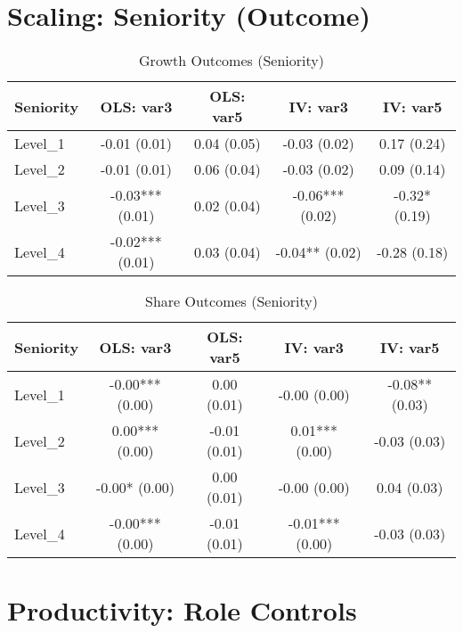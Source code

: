 \documentclass[11pt]{article}
\begin{document}
\section{Scaling: Seniority (Outcome)}

\begin{table}[H]
\centering
\caption{Growth Outcomes (Seniority)}
\begin{tabular}{lcccc}
\toprule
Seniority & OLS: var3 & OLS: var5 & IV: var3 & IV: var5 \\
\midrule
Level\_1 & -0.01 (0.01) & 0.04 (0.05) & -0.03 (0.02) & 0.17 (0.24) \\
Level\_2 & -0.01 (0.01) & 0.06 (0.04) & -0.03 (0.02) & 0.09 (0.14) \\
Level\_3 & -0.03*** (0.01) & 0.02 (0.04) & -0.06*** (0.02) & -0.32* (0.19) \\
Level\_4 & -0.02*** (0.01) & 0.03 (0.04) & -0.04** (0.02) & -0.28 (0.18) \\
\bottomrule
\end{tabular}
\end{table}

\begin{table}[H]
\centering
\caption{Share Outcomes (Seniority)}
\begin{tabular}{lcccc}
\toprule
Seniority & OLS: var3 & OLS: var5 & IV: var3 & IV: var5 \\
\midrule
Level\_1 & -0.00*** (0.00) & 0.00 (0.01) & -0.00 (0.00) & -0.08** (0.03) \\
Level\_2 & 0.00*** (0.00) & -0.01 (0.01) & 0.01*** (0.00) & -0.03 (0.03) \\
Level\_3 & -0.00* (0.00) & 0.00 (0.01) & -0.00 (0.00) & 0.04 (0.03) \\
Level\_4 & -0.00*** (0.00) & -0.01 (0.01) & -0.01*** (0.00) & -0.03 (0.03) \\
\bottomrule
\end{tabular}
\end{table}
\section{Productivity: Role Controls}
\end{document}
